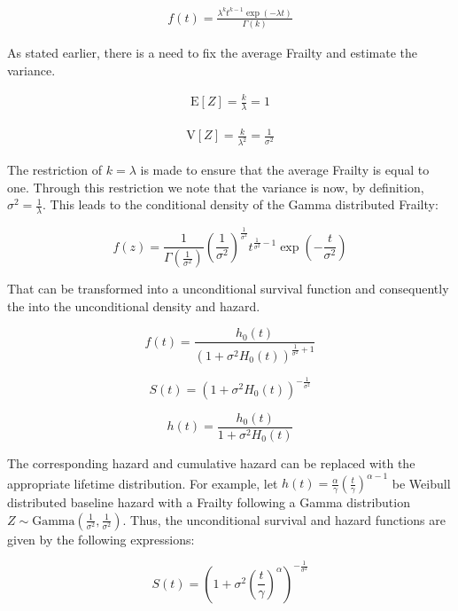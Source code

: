 \begin{align*}
f(t) = \frac{\lambda^k t^{k-1} \exp(-\lambda t)}{\Gamma(k)} \tag{$ k>0, \lambda > 0 $}
\end{align*}


As stated earlier, there is a need to fix the average Frailty and estimate the variance.

\begin{align*}
\mathrm{E}[Z] = \frac{k}{\lambda} = 1 \tag{$ k = \lambda $}
\end{align*}


\begin{align*}
\mathrm{V}[Z] = \frac{k}{\lambda^2} = \frac{1}{\sigma^2} \tag{$ k = \lambda $}
\end{align*}


The restriction of $k = \lambda$ is made to ensure that the average Frailty is equal to one. Through this restriction we note that the variance is now, by definition, $\sigma^2 = \frac{1}{\lambda}$. This leads to the conditional density of the Gamma distributed Frailty:

$$ f(z) = \frac{1}{\Gamma(\frac{1}{\sigma^2})} \left (\frac{1}{\sigma^2}  \right )^{\frac{1}{\sigma^2}} t^{\frac{1}{\sigma^2} - 1} \exp(-\frac{t}{\sigma^2}) $$

That can be transformed into a unconditional survival function and consequently the into the unconditional density and hazard. 

$$ f(t) = \frac{h_0(t)}{(1+ \sigma^2 H_0(t))^{\frac{1}{\sigma^2}+ 1 } }$$

$$ S(t) = (1 + \sigma^2 H_0(t))^{- \frac{1}{\sigma^2}}$$

$$ h(t) = \frac{h_0(t)}{1 + \sigma^2 H_0(t)} $$



The corresponding hazard and cumulative hazard can be replaced with the appropriate lifetime distribution. For example, let $h(t) =  \frac{\alpha}{\gamma} \left (\frac{t}{\gamma}  \right )^{\alpha - 1}$ be Weibull distributed baseline hazard with a Frailty following a Gamma distribution $Z \sim \text{Gamma}(\frac{1}{\sigma^2}, \frac{1}{\sigma^2} )$. Thus, the unconditional survival and hazard functions are given by the following expressions:

$$ S(t) = \left (1 + \sigma^2 \left (\frac{t}{\gamma}  \right )^{\alpha}  \right )^{-\frac{1}{\sigma^2}} $$

